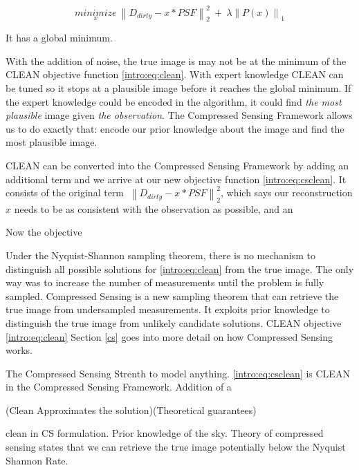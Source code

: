 \begin{equation}\label{intro:eq:csclean}
\underset{x}{minimize} \: \left \| D_{dirty} - x \ast PSF \right \|_2^2 \: + \: \lambda \left \| P(x) \right \|_1
\end{equation}

It has a global minimum.

With the addition of noise, the true image is may not be at the minimum of the CLEAN objective function \eqref{intro:eq:clean}. With expert knowledge CLEAN can be tuned so it stops at a plausible image before it reaches the global minimum. If the expert knowledge could be encoded in the algorithm, it could find \textit{the most plausible} image given \textit{the observation}. The Compressed Sensing Framework allows us to do exactly that: encode our prior knowledge about the image and find the most plausible image.


CLEAN  can be converted into the Compressed Sensing Framework by adding an additional term and we arrive at our new objective function \eqref{intro:eq:csclean}. It consists of the original term $\: \left \| D_{dirty} - x \ast PSF \right \|_2^2$, which says our reconstruction $x$ needs to be as consistent with the observation as possible, and an 



Now the objective 



Under the Nyquist-Shannon sampling theorem, there is no mechanism to distinguish all possible solutions for \eqref{intro:eq:clean} from the true image. The only way was to increase the number of measurements until the problem is fully sampled. Compressed Sensing\cite{candes2006robust}\cite{donoho2006compressed} is a new sampling theorem that can retrieve the true image from undersampled measurements. It exploits prior knowledge to distinguish the true image from unlikely candidate solutions. CLEAN objective \eqref{intro:eq:clean} Section \ref{cs} goes into more detail on how Compressed Sensing works.



The 
Compressed Sensing Strenth to model anything. \eqref{intro:eq:csclean} is CLEAN in the Compressed Sensing Framework. Addition of a 






(Clean Approximates the solution)(Theoretical guarantees)

clean in CS formulation. Prior knowledge of the sky. Theory of compressed sensing states that we can retrieve the true image potentially below the Nyquist Shannon Rate.

